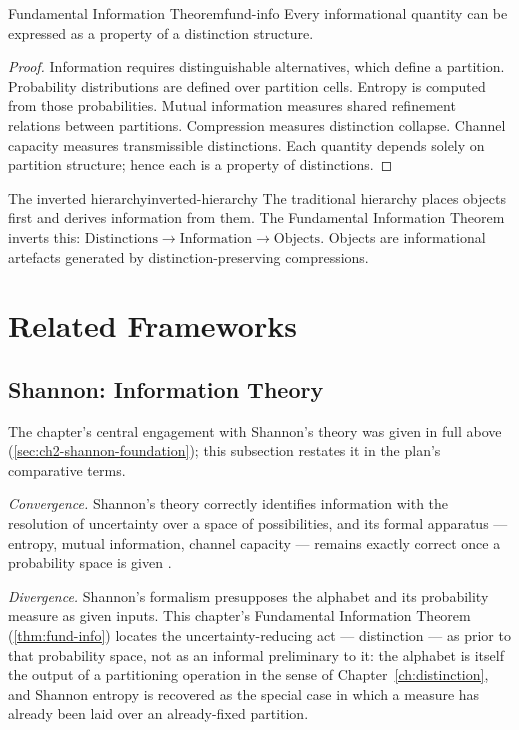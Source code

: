 \documentclass[12pt,twoside,openright]{book}
\begin{document}
\begin{theorem}{Fundamental Information Theorem}{fund-info}
  Every informational quantity can be expressed as a
  property of a distinction structure.
\end{theorem}

\begin{proof}
  Information requires distinguishable alternatives, which
  define a partition. Probability distributions are defined
  over partition cells. Entropy is computed from those
  probabilities. Mutual information measures shared
  refinement relations between partitions. Compression
  measures distinction collapse. Channel capacity measures
  transmissible distinctions. Each quantity depends solely
  on partition structure; hence each is a property of
  distinctions.
\end{proof}

\begin{remark}{The inverted hierarchy}{inverted-hierarchy}
  The traditional hierarchy places objects first and
  derives information from them. The Fundamental
  Information Theorem inverts this:
  $\text{Distinctions} \to \text{Information} \to \text{Objects}$.
  Objects are informational artefacts generated by
  distinction-preserving compressions.
\end{remark}

\section{Related Frameworks}
\label{sec:ch2-related-frameworks}

\subsection*{Shannon: Information Theory}

The chapter's central engagement with Shannon's theory was
given in full above (\cref{sec:ch2-shannon-foundation}); this
subsection restates it in the plan's comparative terms.

\emph{Convergence.} Shannon's theory correctly identifies
information with the resolution of uncertainty over a space of
possibilities, and its formal apparatus --- entropy, mutual
information, channel capacity --- remains exactly correct once
a probability space is given \parencite{shannon1948,shannon1949}.

\emph{Divergence.} Shannon's formalism presupposes the
alphabet and its probability measure as given inputs. This
chapter's Fundamental Information Theorem
(\cref{thm:fund-info}) locates the uncertainty-reducing act ---
distinction --- as prior to that probability space, not as an
informal preliminary to it: the alphabet is itself the output
of a partitioning operation in the sense of
Chapter~\ref{ch:distinction}, and Shannon entropy is recovered
as the special case in which a measure has already been laid
over an already-fixed partition.
\end{document}
